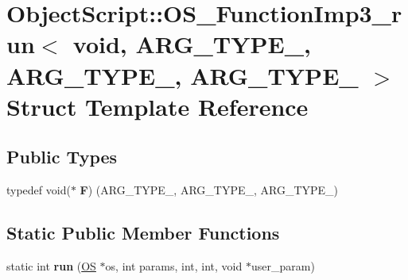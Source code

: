 \hypertarget{struct_object_script_1_1_o_s___function_imp3__run_3_01void_00_01_01_01_a_r_g___t_y_p_e__1_00_01_1b5b83a6e518ab55cb35d5e8a1267f7b}{}\section{Object\+Script\+:\+:O\+S\+\_\+\+Function\+Imp3\+\_\+run$<$ void, A\+R\+G\+\_\+\+T\+Y\+P\+E\+\_, A\+R\+G\+\_\+\+T\+Y\+P\+E\+\_, A\+R\+G\+\_\+\+T\+Y\+P\+E\+\_ $>$ Struct Template Reference}
\label{struct_object_script_1_1_o_s___function_imp3__run_3_01void_00_01_01_01_a_r_g___t_y_p_e__1_00_01_1b5b83a6e518ab55cb35d5e8a1267f7b}
\subsection*{Public Types}
\begin{DoxyCompactItemize}
\item 
typedef void($\ast$ {\bfseries F}) (A\+R\+G\+\_\+\+T\+Y\+P\+E\+\_, A\+R\+G\+\_\+\+T\+Y\+P\+E\+\_, A\+R\+G\+\_\+\+T\+Y\+P\+E\+\_)\hypertarget{struct_object_script_1_1_o_s___function_imp3__run_3_01void_00_01_01_01_a_r_g___t_y_p_e__1_00_01_1b5b83a6e518ab55cb35d5e8a1267f7b_adbf7ef733b6563016111d0b53564b154}{}\label{struct_object_script_1_1_o_s___function_imp3__run_3_01void_00_01_01_01_a_r_g___t_y_p_e__1_00_01_1b5b83a6e518ab55cb35d5e8a1267f7b_adbf7ef733b6563016111d0b53564b154}

\end{DoxyCompactItemize}
\subsection*{Static Public Member Functions}
\begin{DoxyCompactItemize}
\item 
static int {\bfseries run} (\hyperlink{class_object_script_1_1_o_s}{OS} $\ast$os, int params, int, int, void $\ast$user\+\_\+param)\hypertarget{struct_object_script_1_1_o_s___function_imp3__run_3_01void_00_01_01_01_a_r_g___t_y_p_e__1_00_01_1b5b83a6e518ab55cb35d5e8a1267f7b_a4a9506e709fa1b2def0a18834bcbb1f7}{}\label{struct_object_script_1_1_o_s___function_imp3__run_3_01void_00_01_01_01_a_r_g___t_y_p_e__1_00_01_1b5b83a6e518ab55cb35d5e8a1267f7b_a4a9506e709fa1b2def0a18834bcbb1f7}

\end{DoxyCompactItemize}


